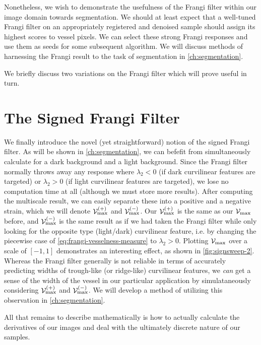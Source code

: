     Nonetheless, we wish to demonstrate the usefulness of the Frangi filter within our image domain towards segmentation. We should at least expect that a well-tuned Frangi filter on an appropriately registered and denoised sample should assign its highest scores to vessel pixels. We can select these strong Frangi responses and use them as seeds for some subsequent algorithm. We will discuss methods of harnessing the Frangi result to the task of segmentation in \cref{ch:segmentation}.
    
    We briefly discuss two variations on the Frangi filter which will prove useful in turn.



\section{The Signed Frangi Filter} \label{sec:signed-frangi-filter}
We finally introduce the novel (yet straightforward) notion of the signed Frangi filter. As will be shown in \cref{ch:segmentation}, we can befefit from simultaneously calculate for a dark background and a light background. Since the Frangi filter normally throws away any response where $\lambda_2 < 0$ (if dark curvilinear features are targeted) or $\lambda_2 >0$ (if light curvilinear features are targeted), we lose no computation time at all (although we must store more results). After computing the multiscale result, we can easily separate these into a positive and a negative strain, which we will denote
$\mathcal{V}_{\max}^{(+)}$ and $\mathcal{V}_{\max}^{(-)}$. Our $\mathcal{V}_{\max}^{(+)}$ is the same as our $\mathcal{V}_{\max}$ before, and $\mathcal{V}_{\max}^{(-)}$ is the same result as if we had taken the Frangi filter while only looking for the opposite type (light/dark) curvilinear feature, i.e. by changing the piecewise case of \cref{eq:frangi-vesselness-measure} to $\lambda_2 > 0$. Plotting $\mathcal{V}_{\max}$ over a scale of $[-1,1]$ demonstrates an interesting effect, as shown in \cref{fig:signsweep-2}. Whereas the Frangi filter generally is not reliable in terms of accurately predicting widths of trough-like (or ridge-like) curvilinear features, we \textit{can} get a sense of the width of the vessel in our particular application by simulataneously considering $\mathcal{V}^{(+)}_{\max}$ and $\mathcal{V}^{(-)}_{\max}$. We will develop a method of utilizing this observation in \cref{ch:segmentation}.


All that remains to describe mathematically is how to actually calculate the derivatives of our images and deal with the ultimately discrete nature of our samples.

